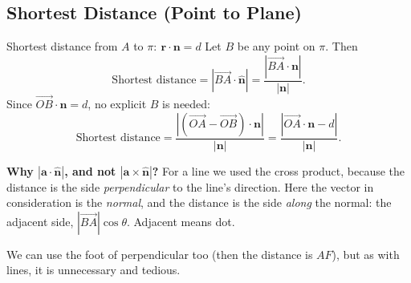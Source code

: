 \clearpage
\subsection{Shortest Distance (Point to Plane)}
\begin{definition}{{Shortest distance from $A$ to $\pi:\ \mathbf{r}\cdot\mathbf{n} = d$}}
Let $B$ be any point on $\pi$. Then
\[
\text{Shortest distance} = \left|\overrightarrow{BA}\cdot\hat{\mathbf{n}}\right| = \dfrac{\left|\overrightarrow{BA}\cdot\mathbf{n}\right|}{|\mathbf{n}|}.
\]
Since $\overrightarrow{OB}\cdot\mathbf{n} = d$, no explicit $B$ is needed:
\[
\text{Shortest distance} = \dfrac{\left|(\overrightarrow{OA} - \overrightarrow{OB})\cdot\mathbf{n}\right|}{|\mathbf{n}|} = \dfrac{\left|\overrightarrow{OA}\cdot\mathbf{n} - d\right|}{|\mathbf{n}|}.
\]
\end{definition}

\begin{center}
\end{center}

\begin{info}
\textbf{Why $|\mathbf{a}\cdot\hat{\mathbf{n}}|$, and not $|\mathbf{a}\times\hat{\mathbf{n}}|$?} For a line we used the cross product, because the distance is the side \emph{perpendicular} to the line's direction. Here the vector in consideration is the \emph{normal}, and the distance is the side \emph{along} the normal: the adjacent side, $|\overrightarrow{BA}|\cos\theta$. Adjacent means dot.

We can use the foot of perpendicular too (then the distance is $AF$), but as with lines, it is unnecessary and tedious.
\end{info}

